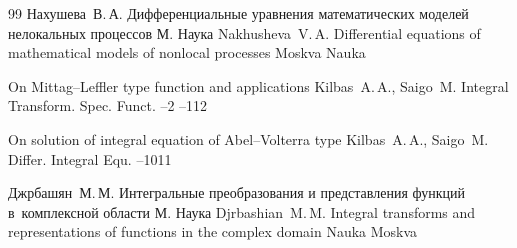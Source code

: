 \begin{thebibliography}{99}
\by Нахушева~В.\,А.
\book Дифференциальные уравнения математических моделей нелокальных процессов
\publaddr М.
\publ Наука
\misctransl
\by Nakhusheva~V.\,A.
\book Differential equations of mathematical models of nonlocal processes
\publaddr Moskva
\publ Nauka

\paper On Mittag--Leffler type function and applications
\by Kilbas~A.\,A., Saigo~M.
\jour Integral Transform. Spec. Funct. 
--2
--112

\paper On solution of integral equation of Abel--Volterra type
\by Kilbas~A.\,A., Saigo~M.
\jour Differ. In\-teg\-ral Equ.
--1011

\by Джрбашян~М.\,М.
\book Интегральные преобразования и представления функций в~комплексной области
\publaddr М.
\publ Наука
\misctransl
\by Djrbashian~M.\,M.
\book Integral transforms and representations of functions in the complex domain
\publ Nauka
\publaddr Moskva

\end{thebibliography}

\noindent
\hskip6.5cm \thedate \par\noindent
\hskip6.5cm\therevdate\par



\pagebreak


\makeengtitlem

\renewcommand{\baselinestretch}{0.9}


\newpage

%
%
%

